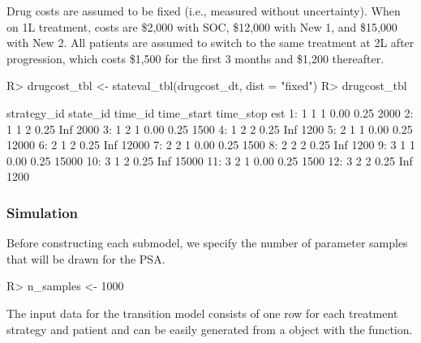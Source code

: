 \documentclass[article, nojss]{jss}\usepackage[]{graphicx}\usepackage[]{color}
\begin{document}
Drug costs are assumed to be fixed (i.e., measured without uncertainty). When on 1L treatment, costs are \$2,000 with SOC, \$12,000 with New 1, and \$15,000 with New 2. All patients are assumed to switch to the same treatment at 2L after progression, which costs \$1,500 for the first 3 months and \$1,200 thereafter.



\begin{Schunk}
\begin{Sinput}
R> drugcost_tbl <- stateval_tbl(drugcost_dt, dist = "fixed")
R> drugcost_tbl
\end{Sinput}
\begin{Soutput}
    strategy_id state_id time_id time_start time_stop   est
 1:           1        1       1       0.00      0.25  2000
 2:           1        1       2       0.25       Inf  2000
 3:           1        2       1       0.00      0.25  1500
 4:           1        2       2       0.25       Inf  1200
 5:           2        1       1       0.00      0.25 12000
 6:           2        1       2       0.25       Inf 12000
 7:           2        2       1       0.00      0.25  1500
 8:           2        2       2       0.25       Inf  1200
 9:           3        1       1       0.00      0.25 15000
10:           3        1       2       0.25       Inf 15000
11:           3        2       1       0.00      0.25  1500
12:           3        2       2       0.25       Inf  1200
\end{Soutput}
\end{Schunk}

\subsubsection{Simulation}
Before constructing each submodel, we specify the number of parameter samples that will be drawn for the PSA.

\begin{Schunk}
\begin{Sinput}
R> n_samples <- 1000
\end{Sinput}
\end{Schunk}

The input data for the transition model consists of one row for each treatment strategy and patient and can be easily generated from a  object with the  function.
\end{document}
